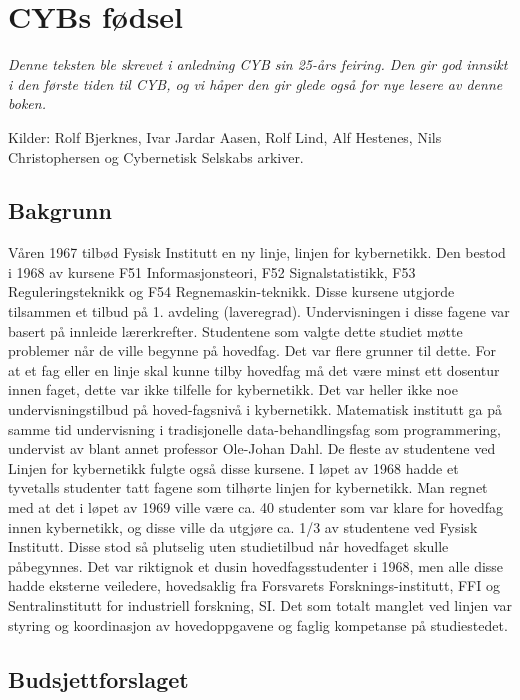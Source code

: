 \documentclass[../../main.tex]{subfiles}
\begin{document}
\chapter{CYBs fødsel}

\emph{Denne teksten ble skrevet i anledning CYB sin 25-års feiring. Den gir god innsikt i den første tiden til CYB, og vi håper den gir glede også for nye lesere av denne boken.}

\author{Av Jon E. Dahlen}

Kilder: Rolf Bjerknes, Ivar Jardar Aasen, Rolf Lind, Alf Hestenes, Nils Christophersen og Cybernetisk Selskabs arkiver.

\section{Bakgrunn}

Våren 1967 tilbød Fysisk Institutt en ny linje, linjen for kybernetikk. Den bestod i 1968 av kursene F51 Informasjonsteori, F52 Signalstatistikk, F53 Reguleringsteknikk og F54 Regnemaskin-teknikk. Disse kursene utgjorde tilsammen et tilbud på 1. avdeling (laveregrad). Undervisningen i disse fagene var basert på innleide lærerkrefter. Studentene som valgte dette studiet møtte problemer når de ville begynne på hovedfag. Det var flere grunner til dette. For at et fag eller en linje skal kunne tilby hovedfag må det være minst ett dosentur innen faget, dette var ikke tilfelle for kybernetikk. Det var heller ikke noe undervisningstilbud på hoved-fagsnivå i kybernetikk. Matematisk institutt ga på samme tid undervisning i tradisjonelle data-behandlingsfag som programmering, undervist av blant annet professor Ole-Johan Dahl. De fleste av studentene ved Linjen for kybernetikk fulgte også disse kursene. I løpet av 1968 hadde et tyvetalls studenter tatt fagene som tilhørte linjen for kybernetikk. Man regnet med at det i løpet av 1969 ville være ca. 40 studenter som var klare for hovedfag innen kybernetikk, og disse ville da utgjøre ca. 1/3 av studentene ved Fysisk Institutt. Disse stod så plutselig uten studietilbud når hovedfaget skulle påbegynnes. Det var riktignok et dusin hovedfagsstudenter i 1968, men alle disse hadde eksterne veiledere, hovedsaklig fra Forsvarets Forsknings-institutt, FFI og Sentralinstitutt for industriell forskning, SI. Det som totalt manglet ved linjen var styring og koordinasjon av hovedoppgavene og faglig kompetanse på studiestedet.

\section{Budsjettforslaget}
\end{document}

